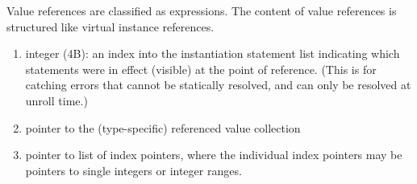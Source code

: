 Value references are classified as expressions.  
The content of value references is structured like 
virtual instance references.  

\begin{enumerate}
\item integer (4B): an index into the instantiation statement list
	indicating which statements were in effect (visible) at the
	point of reference.  (This is for catching errors that cannot
	be statically resolved, and can only be resolved at unroll time.)
\item pointer to the (type-specific) referenced value collection
\item pointer to list of index pointers,
	where the individual index pointers may be
	pointers to single integers or integer ranges.
\end{enumerate}




